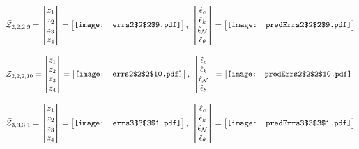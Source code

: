 \documentclass[12pt]{article}
\begin{document}
\begin{gather*}
\bar{\mathcal{Z}}_{2,2,2,9}=\begin{bmatrix}
z_1\\
z_2\\
z_3\\
z_4
 \end{bmatrix}= \begin{bmatrix}
\vcenter{\hbox{\texttt{[image: errs2\$2\$2\$9.pdf]}}}
 \end{bmatrix},\,\, \begin{bmatrix}
\hat{\epsilon}_c\\\hat{\epsilon}_k\\\hat{\epsilon}_\mathcal{N}\\\hat{\epsilon}_\theta
 \end{bmatrix}=\begin{bmatrix}
\vcenter{\hbox{\texttt{[image: predErrs2\$2\$2\$9.pdf]}}}
 \end{bmatrix}
\end{gather*}

\begin{gather*}
\bar{\mathcal{Z}}_{2,2,2,10}=\begin{bmatrix}
z_1\\
z_2\\
z_3\\
z_4
 \end{bmatrix}= \begin{bmatrix}
\vcenter{\hbox{\texttt{[image: errs2\$2\$2\$10.pdf]}}}
 \end{bmatrix},\,\, \begin{bmatrix}
\hat{\epsilon}_c\\\hat{\epsilon}_k\\\hat{\epsilon}_\mathcal{N}\\\hat{\epsilon}_\theta
 \end{bmatrix}=\begin{bmatrix}
\vcenter{\hbox{\texttt{[image: predErrs2\$2\$2\$10.pdf]}}}
 \end{bmatrix}
\end{gather*}

\begin{gather*}
\bar{\mathcal{Z}}_{3,3,3,1}=\begin{bmatrix}
z_1\\
z_2\\
z_3\\
z_4
 \end{bmatrix}= \begin{bmatrix}
\vcenter{\hbox{\texttt{[image: errs3\$3\$3\$1.pdf]}}}
 \end{bmatrix},\,\, \begin{bmatrix}
\hat{\epsilon}_c\\\hat{\epsilon}_k\\\hat{\epsilon}_\mathcal{N}\\\hat{\epsilon}_\theta
 \end{bmatrix}=\begin{bmatrix}
\vcenter{\hbox{\texttt{[image: predErrs3\$3\$3\$1.pdf]}}}
 \end{bmatrix}
\end{gather*}
\end{document}
